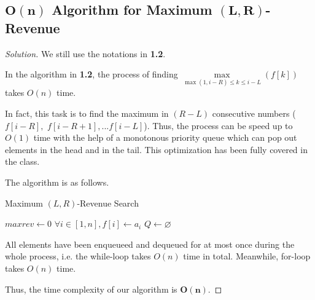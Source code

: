 \documentclass{article}
\newenvironment{solution}{\begin{proof}[\noindent\it Solution]}{\end{proof}}
\begin{document}
\subsection{$\boldsymbol{O(n)}$ Algorithm for Maximum $\boldsymbol{(L,R)}$-Revenue}
\vspace{1em}
\begin{solution}
    We still use the notations in \textbf{1.2}.
    
    \hspace{2.6em}
    In the algorithm in \textbf{1.2}, the process of finding $\underset{\max(1,i-R)\le k\le i-L}{\max}(f[k])$ takes $O(n)$ time. 
    
    \vspace{0.3em} \hspace{2.6em}
    In fact, this task is to find the maximum in $(R-L)$ consecutive numbers ($f[i-R],$ $f[i-R+1],...f[i-L]$). Thus, the process can be speed up to $O(1)$ time with the help of a monotonous priority queue which can pop out elements in the head and in the tail. This optimization has been fully covered in the class.
    
    \hspace{2.6em}
    The algorithm is as follows.
    
    \vspace{-0.5em}
    \begin{algorithm}
        \caption{Maximum $(L,R)$-Revenue Search}
        
	    {
	        $maxrev\gets 0$\;
	        $\forall i\in[1,n], f[i]\gets a_i$\;
	        \BlankLine
	        \BlankLine
	        $Q\gets\varnothing$\;
	   }
    \end{algorithm}
    
    \vspace{-1em} \hspace{2.6em}
    All elements have been enqueueed and dequeued for at most once during the whole process, i.e. the while-loop takes $O(n)$ time in total. Meanwhile, for-loop takes $O(n)$ time.
    
    \hspace{2.6em}
    Thus, the time complexity of our algorithm is \underline{$\boldsymbol{O(n)}$}.
\end{solution}
\end{document}
